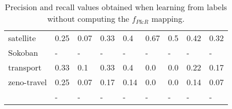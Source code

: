 \documentclass{article}
\begin{document}
\begin{table}
\begin{center}
\begin{scriptsize}
\begin{tabular}{l|l|l|l|l|l|l||l|l|}
				satellite & 0.25 & 0.07 & 0.33 & 0.4 & 0.67 & 0.5 & 0.42 & 0.32 \\
				Sokoban & - & - & - & - & - & - & - & - \\ %
				transport & 0.33 & 0.1 & 0.33 & 0.4 & 0.0 & 0.0 & 0.22 & 0.17 \\
				zeno-travel & 0.25 & 0.07 & 0.17 & 0.14 & 0.0 & 0.0 & 0.14 & 0.07 \\
				\hline
				\bf  & - & - & - & - & - & - & - & - \\
			\end{tabular}
		\end{scriptsize}
	\end{center}
	\caption{\small Precision and recall values obtained when learning from labels without computing the $f_{P\&R}$ mapping.}
	\label{fig:labelsnomap}                
	

\end{table}
\end{document}

